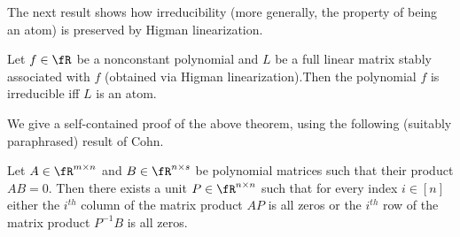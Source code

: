 The next result shows how irreducibility (more generally, the property
of being an atom) is preserved by Higman linearization.

\begin{theorem}\label{associates-preseve-atoms}
Let $f\in\fR$ be a nonconstant polynomial and $L$ 
%
%
  be a full linear matrix stably associated with $f$ (obtained via
Higman linearization).Then the
polynomial $f$ is irreducible iff $L$ is an atom.
%
\end{theorem}

We give a self-contained proof of the above theorem, using the
following (suitably paraphrased) result of Cohn.

\begin{lemma}{\rm\cite[pp.~198]{Cohnintro}}\label{triv-lemma}
    Let $A\in\fR^{m\times n}$ and $B\in\fR^{n\times s}$ be polynomial
    matrices such that their product $AB=0$. Then there exists a unit
    $P\in \fR^{n\times n}$ such that for every index $i\in [n]$ either
    the $i^{th}$ column of the matrix product $AP$ is all zeros or the
    $i^{th}$ row of the matrix product $P^{-1}B$ is all zeros.
\end{lemma}    

